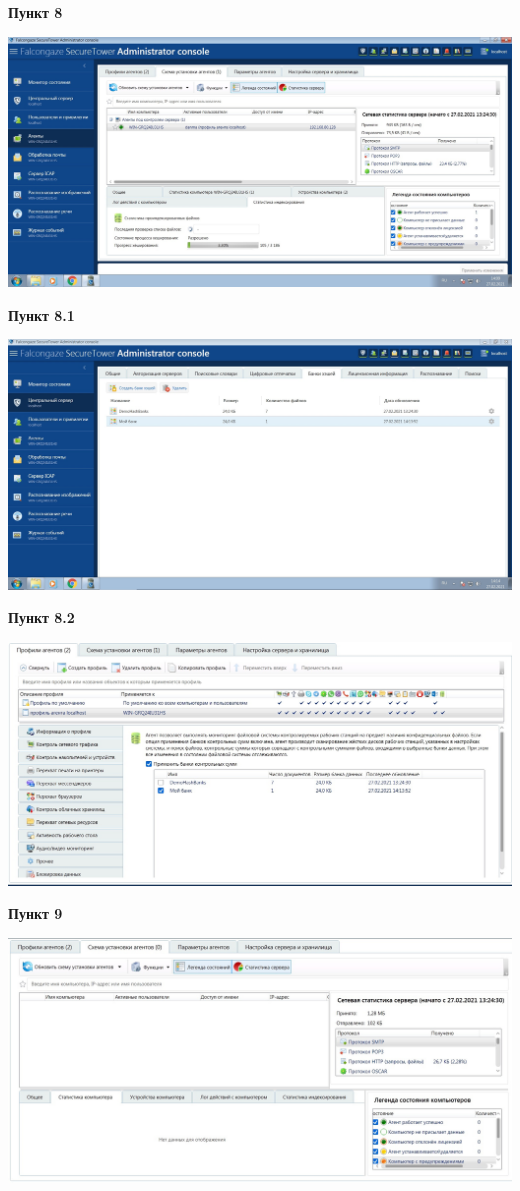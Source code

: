 \documentclass[a4paper,14pt]{extarticle}
\begin{document}
    \newpage
    \textbf{Пункт 8} \\
    \begin{center}
        \includegraphics[scale=0.25]{pics/8.jpg}
    \end{center}

    \textbf{Пункт 8.1} \\
    \begin{center}
        \includegraphics[scale=0.25]{pics/8_1.jpg}
    \end{center}

    \newpage
    \textbf{Пункт 8.2} \\
    \begin{center}
        \includegraphics[scale=0.25]{pics/8_2.jpg}
    \end{center}

    \textbf{Пункт 9} \\
    \begin{center}
        \includegraphics[scale=0.25]{pics/9.jpg}
    \end{center}

    
\end{document}
